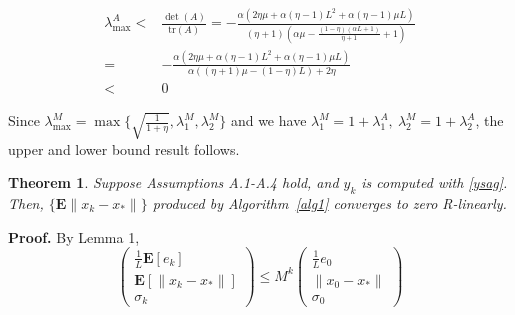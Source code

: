 \documentclass[11pt]{article}
\newtheorem{thm}{Theorem}
\newcommand{\E}{\mathbf{E}}
\begin{document}
\begin{align*}\label{eq:lambdaA}
 \lambda_{\max}^A < & \frac{\det(A)}{\mbox{tr}(A)} = - \frac{\alpha  \left(2 \eta  \mu +\alpha  (\eta -1) L^2+\alpha  (\eta -1) \mu  L\right)}{(\eta +1) \left(\alpha  \mu -\frac{(1-\eta ) (\alpha  L+1)}{\eta +1}+1\right)} \\
                   =& -\frac{\alpha  \left(2 \eta  \mu +\alpha  (\eta -1) L^2+\alpha  (\eta -1) \mu  L\right)}{\alpha  ((\eta +1) \mu -  (1-\eta ) L)+2 \eta } \\
				   < & 0
\end{align*}


Since $\lambda^M_{\max} = \max\{\sqrt{\frac{1}{1+\eta}},\lambda^M_1,\lambda^M_2\}$ and we have $\lambda^M_1=1+\lambda^A_1,\ \lambda^M_2=1+\lambda^A_2$, the upper and lower bound result follows.


\begin{thm}\label{thm:linear}
 Suppose Assumptions A.1-A.4 hold, and $y_k$ is computed with \eqref{ysag}.  Then, $\{\E\|x_k-x_\ast\|\}$ produced by Algorithm~\ref{alg1} converges to zero R-linearly.
\end{thm}

\noindent 
\textbf{Proof.}  By Lemma 1, 
\begin{equation}
 \begin{pmatrix} \frac{1}{L}\E[e_k]\\ \E[\|x_k-x_\ast \|] \\ \sigma_k \end{pmatrix} 
\leq M^k
 \begin{pmatrix} \frac{1}{L}e_0 \\ \| x_0-x_\ast \| \\ \sigma_0 \end{pmatrix} 
\end{equation}
\end{document}
